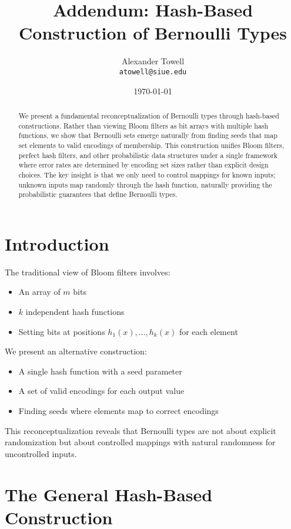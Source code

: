 \documentclass[11pt,final,hidelinks]{article}
\title{Addendum: Hash-Based Construction of Bernoulli Types}
\author{
    Alexander Towell\\
    \texttt{atowell@siue.edu}
}
\date{\today}
\begin{document}
\maketitle

\begin{abstract}
We present a fundamental reconceptualization of Bernoulli types through hash-based constructions. Rather than viewing Bloom filters as bit arrays with multiple hash functions, we show that Bernoulli sets emerge naturally from finding seeds that map set elements to valid encodings of membership. This construction unifies Bloom filters, perfect hash filters, and other probabilistic data structures under a single framework where error rates are determined by encoding set sizes rather than explicit design choices. The key insight is that we only need to control mappings for known inputs; unknown inputs map randomly through the hash function, naturally providing the probabilistic guarantees that define Bernoulli types.
\end{abstract}

\section{Introduction}

The traditional view of Bloom filters involves:
\begin{itemize}
    \item An array of $m$ bits
    \item $k$ independent hash functions
    \item Setting bits at positions $h_1(x), \ldots, h_k(x)$ for each element
\end{itemize}

We present an alternative construction:
\begin{itemize}
    \item A single hash function with a seed parameter
    \item A set of valid encodings for each output value
    \item Finding seeds where elements map to correct encodings
\end{itemize}

This reconceptualization reveals that Bernoulli types are not about explicit randomization but about controlled mappings with natural randomness for uncontrolled inputs.

\section{The General Hash-Based Construction}
\end{document}
